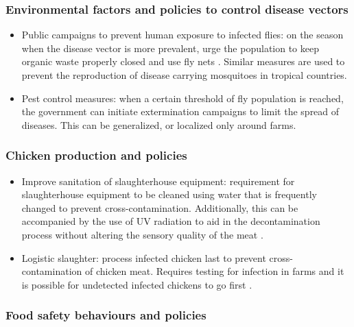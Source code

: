 \subsubsection{Environmental factors and policies to control disease vectors}
\begin{itemize}
    \item Public campaigns to prevent human exposure to infected flies: on the season when the disease vector is more prevalent, urge the population to keep organic waste properly closed and use fly nets \parencite{hald_use_2007}. Similar measures are used to prevent the reproduction of disease carrying mosquitoes in tropical countries. %
    \item Pest control measures: when a certain threshold of fly population is reached, the government can initiate extermination campaigns to limit the spread of diseases. This can be generalized, or localized only around farms.
\end{itemize}

\subsubsection{Chicken production and policies}
\begin{itemize}
    \item Improve sanitation of slaughterhouse equipment: requirement for slaughterhouse equipment to be cleaned using water that is frequently changed to prevent cross-contamination. Additionally, this can be accompanied by the use of UV radiation to aid in the decontamination process without altering the sensory quality of the meat \parencite{isohanni_use_2009}.
    \item Logistic slaughter: process infected chicken last to prevent cross-contamination of chicken meat. Requires testing for infection in farms and it is possible for undetected infected chickens to go first \parencite{evers_predicted_2004}. 
\end{itemize}

\subsubsection{Food safety behaviours and policies}

